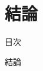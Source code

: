 \section{結論}

\begin{frame}[noframenumbering]{目次}
    \tableofcontents[currentsection]
\end{frame}

\begin{frame}{結論}
    
\end{frame}
